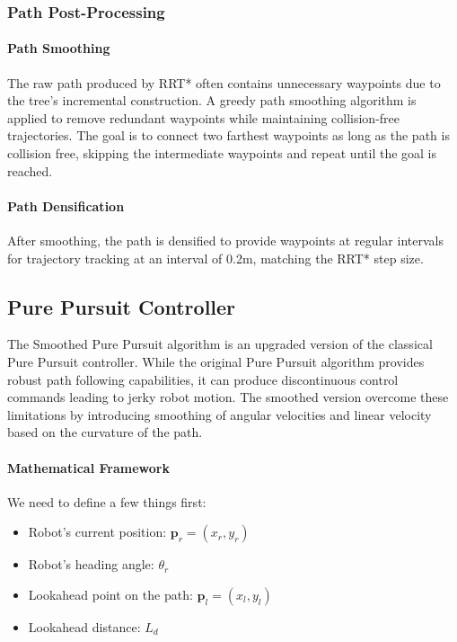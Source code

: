 \documentclass[11pt]{article}
\begin{document}
\subsubsection{Path Post-Processing}

\paragraph{Path Smoothing}

The raw path produced by RRT* often contains unnecessary waypoints due to the tree's incremental construction. A greedy path smoothing algorithm is applied to remove redundant waypoints while maintaining collision-free trajectories. The goal is to connect two farthest waypoints as long as the path is collision free, skipping the intermediate waypoints and repeat until the goal is reached.

\paragraph{Path Densification}

After smoothing, the path is densified to provide waypoints at regular intervals for trajectory tracking at an interval of 0.2m, matching the RRT* step size.


\subsection{Pure Pursuit Controller}

The Smoothed Pure Pursuit algorithm is an upgraded version of the classical Pure Pursuit controller. While the original Pure Pursuit algorithm \cite{coulter1992} provides robust path following capabilities, it can produce discontinuous control commands leading to jerky robot motion. The smoothed version overcome these limitations by introducing smoothing of angular velocities and linear velocity based on the curvature of the path.

\paragraph{Mathematical Framework}

We need to define a few things first:
\begin{itemize}
	\item Robot's current position: $\mathbf{p}_r = (x_r, y_r)$
	\item Robot's heading angle: $\theta_r$
	\item Lookahead point on the path: $\mathbf{p}_l = (x_l, y_l)$
	\item Lookahead distance: $L_d$
\end{itemize}
\end{document}
